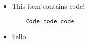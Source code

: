 \begin{itemize}
    \item This item contains code!
    \begin{lstlisting}
    Code code code
    \end{lstlisting}
    \item hello
    \end{itemize}
